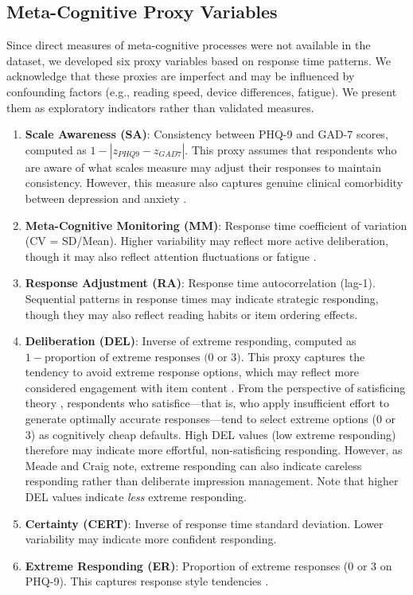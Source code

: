 \documentclass[10pt,twocolumn]{article}
\begin{document}
\subsection{Meta-Cognitive Proxy Variables}

Since direct measures of meta-cognitive processes were not available in the dataset, we developed six proxy variables based on response time patterns. We acknowledge that these proxies are imperfect and may be influenced by confounding factors (e.g., reading speed, device differences, fatigue). We present them as exploratory indicators rather than validated measures.

\begin{enumerate}
    \item \textbf{Scale Awareness (SA)}: Consistency between PHQ-9 and GAD-7 scores, computed as $1 - |z_{PHQ9} - z_{GAD7}|$. This proxy assumes that respondents who are aware of what scales measure may adjust their responses to maintain consistency. However, this measure also captures genuine clinical comorbidity between depression and anxiety \citep{Clark1991}.
    \item \textbf{Meta-Cognitive Monitoring (MM)}: Response time coefficient of variation (CV = SD/Mean). Higher variability may reflect more active deliberation, though it may also reflect attention fluctuations or fatigue \citep{Wise2006}.
    \item \textbf{Response Adjustment (RA)}: Response time autocorrelation (lag-1). Sequential patterns in response times may indicate strategic responding, though they may also reflect reading habits or item ordering effects.
    \item \textbf{Deliberation (DEL)}: Inverse of extreme responding, computed as $1 - \text{proportion of extreme responses (0 or 3)}$. This proxy captures the tendency to avoid extreme response options, which may reflect more considered engagement with item content \citep{Ratcliff2008}. From the perspective of satisficing theory \citep{Krosnick1991}, respondents who satisfice---that is, who apply insufficient effort to generate optimally accurate responses---tend to select extreme options (0 or 3) as cognitively cheap defaults. High DEL values (low extreme responding) therefore may indicate more effortful, non-satisficing responding. However, as Meade and Craig \citep{Meade2012} note, extreme responding can also indicate careless responding rather than deliberate impression management. Note that higher DEL values indicate \textit{less} extreme responding.
    \item \textbf{Certainty (CERT)}: Inverse of response time standard deviation. Lower variability may indicate more confident responding.
    \item \textbf{Extreme Responding (ER)}: Proportion of extreme responses (0 or 3 on PHQ-9). This captures response style tendencies \citep{Baumgartner2001}.
\end{enumerate}
\end{document}

